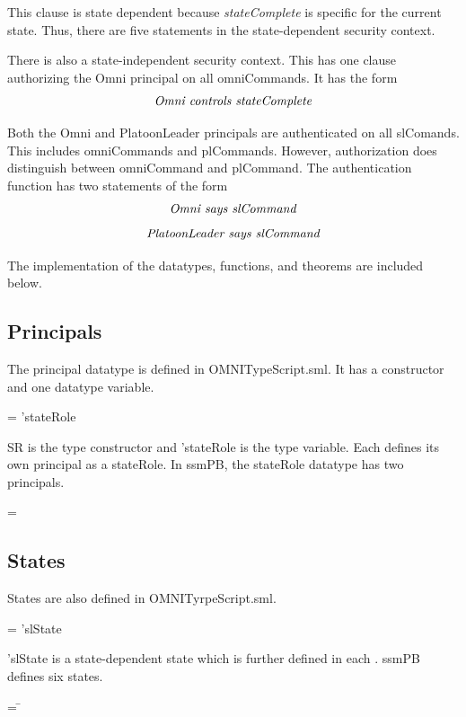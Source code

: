 \documentclass[../../main/main.tex]{subfiles}
\begin{document}
This clause is state dependent because \textit{stateComplete} is specific for the current state.  Thus, there are five statements in the state-dependent security context.

There is also a state-independent security context.  This has one clause authorizing the Omni principal on all omniCommands.   It has the form
\[\text{\textit{Omni controls stateComplete}}\]

Both the Omni and PlatoonLeader principals are authenticated on all slComands.  This includes omniCommands and plCommands.  However, authorization does distinguish between omniCommand and plCommand.  The authentication function has two statements of the form
\[\text{\textit{Omni says slCommand}}\]
\[\text{\textit{PlatoonLeader says slCommand}}\]  

The  implementation of the datatypes, functions, and theorems are included below.


\subsection{Principals}
The principal datatype is defined in OMNITypeScript.sml.  It has a constructor and one datatype variable.

 =  'stateRole

SR is the type constructor and 'stateRole is the type variable.  Each  defines its own principal as a stateRole. In ssmPB, the stateRole datatype has two principals.

 =  \HOLTokenBar{} 

\subsection{States}
States are also defined in OMNITyrpeScript.sml.

 =   \HOLTokenBar{}  'slState

'slState is a state-dependent state which is further defined in each .  ssmPB defines six states.

\begin{tabbing}
 = \= \\
					\>\HOLTokenBar{}  \\
					\>\HOLTokenBar{}  \\
					\>\HOLTokenBar{} \\
        					\>\HOLTokenBar{}  \\
					\>\HOLTokenBar{} 
\end{tabbing}
\end{document}
